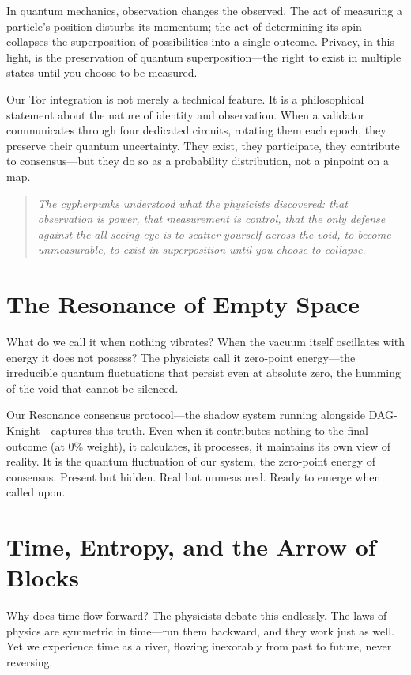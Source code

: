 \documentclass[12pt,a4paper]{article}
\begin{document}
In quantum mechanics, observation changes the observed. The act of measuring a particle's position disturbs its momentum; the act of determining its spin collapses the superposition of possibilities into a single outcome. Privacy, in this light, is the preservation of quantum superposition---the right to exist in multiple states until you choose to be measured.

Our Tor integration is not merely a technical feature. It is a philosophical statement about the nature of identity and observation. When a validator communicates through four dedicated circuits, rotating them each epoch, they preserve their quantum uncertainty. They exist, they participate, they contribute to consensus---but they do so as a probability distribution, not a pinpoint on a map.

\begin{quote}
\itshape
The cypherpunks understood what the physicists discovered: that observation is power, that measurement is control, that the only defense against the all-seeing eye is to scatter yourself across the void, to become unmeasurable, to exist in superposition until you choose to collapse.
\end{quote}

\section{The Resonance of Empty Space}

What do we call it when nothing vibrates? When the vacuum itself oscillates with energy it does not possess? The physicists call it zero-point energy---the irreducible quantum fluctuations that persist even at absolute zero, the humming of the void that cannot be silenced.

Our Resonance consensus protocol---the shadow system running alongside DAG-Knight---captures this truth. Even when it contributes nothing to the final outcome (at 0\% weight), it calculates, it processes, it maintains its own view of reality. It is the quantum fluctuation of our system, the zero-point energy of consensus. Present but hidden. Real but unmeasured. Ready to emerge when called upon.

\section{Time, Entropy, and the Arrow of Blocks}

Why does time flow forward? The physicists debate this endlessly. The laws of physics are symmetric in time---run them backward, and they work just as well. Yet we experience time as a river, flowing inexorably from past to future, never reversing.
\end{document}
